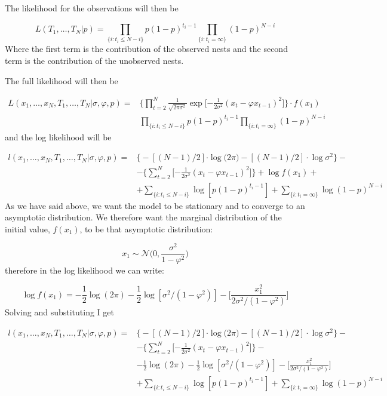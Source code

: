 \documentclass[11pt,a4paper]{article}
\begin{document}
The likelihood for the observations will then be

\[
L(T_{1}, \dots, T_{N} | p) = \prod_{\{i:t_{i} \leq N - i \}} p (1 - p)^{t_{i} - 1} \prod_{\{i: t_{i} = \infty\}} (1 - p)^{N - i }
\]
Where the first term is the contribution of the observed nests and the second term is the contribution of the unobserved nests.

The full likelihood will then be

\[
\begin{split}
L(x_{1}, \dots, x_{N} , T_{1}, \dots, T_{N} | \sigma, \varphi, p) = & \Bigg \{ \prod_{t=2}^{N}  \frac{1}{\sqrt{2 \pi \sigma^{2}}} \exp \Bigg [ { - \frac{1}{2 \sigma^{2}} }  (x_{t} - \varphi x_{t-1})^{2} \Bigg ] \Bigg \} \cdot f(x_{1}) \\ 
& \prod_{\{i:t_{i} \leq {N - i} \}} p (1 - p)^{t_{i} - 1} \prod_{\{i: t_{i} = \infty\}} (1 - p)^{N - i}
\end{split}
\]
and the log likelihood will be

\[
\begin{split}
l(x_{1}, \dots, x_{N} , T_{1}, \dots, T_{N} | \sigma, \varphi, p) = & \Bigg \{ -[(N - 1)/2]{ \cdot \log (2 \pi }) - [(N - 1)/2] \cdot{\log \sigma^{2}} \Bigg \} - \\
& - \Bigg \{ \sum_{t=2}^{N}  \Bigg [ { - \frac{1}{2 \sigma^{2}} }  (x_{t} - \varphi x_{t-1})^{2} \Bigg ] \Bigg \} + \log f(x_{1}) + \\
& +   \sum_{\{i:t_{i} \leq N - i \}} \log [p (1 - p)^{t_{i} - 1}] + \sum_{\{i: t_{i} = \infty\}} \log (1 - p)^{N - i }
\end{split}
\]
As we have said above, we want the model to be stationary and to converge to an asymptotic distribution. We therefore want the marginal distribution of the initial value, $f(x_{1})$, to be that asymptotic distribution:

\[
x_{1} \sim \mathcal{N} \Bigg (0, \frac{\sigma^2}{1- \varphi^2} \Bigg )
\]
therefore in the log likelihood we can write:

\[
\log f(x_{1}) = - \frac{1}{2} \log(2 \pi) - \frac{1}{2} \log[\sigma^2 / (1 - \varphi^2)] - \Bigg [\frac{x_{1}^{2}}{2 \sigma^2/(1 - \varphi^2)} \Bigg ]
\]
Solving and substituting I get

\[
\begin{split}
l(x_{1}, \dots, x_{N} , T_{1}, \dots, T_{N} | \sigma, \varphi, p) = & \Bigg \{ -[(N - 1)/2]{ \cdot \log (2 \pi }) - [(N - 1)/2] \cdot{\log \sigma^{2}} \Bigg \} - \\
& - \Bigg \{ \sum_{t=2}^{N}  \Bigg [ { - \frac{1}{2 \sigma^{2}} }  (x_{t} - \varphi x_{t-1})^{2} \Bigg ] \Bigg \} - \\
& - \frac{1}{2} \log(2 \pi) - \frac{1}{2} \log[\sigma^2 / (1 - \varphi^2)] - \Bigg [\frac{x_{1}^{2}}{2 \sigma^2/(1 - \varphi^2)} \Bigg ] \\
& +   \sum_{\{i:t_{i} \leq N - i \}} \log [p (1 - p)^{t_{i} - 1}] + \sum_{\{i: t_{i} = \infty\}} \log (1 - p)^{N - i}
\end{split}
\]
\end{document}
